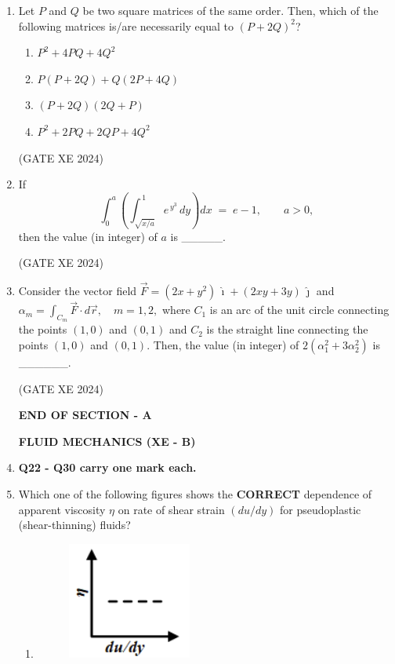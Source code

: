 \documentclass[12pt]{article}
\begin{document}
\begin{enumerate}
\item Let $P$ and $Q$ be two square matrices of the same order. Then, which of the
following matrices is/are necessarily equal to $(P+2Q)^2$?

\begin{enumerate}[label=(\Alph*)]
\item $P^{2}+4PQ+4Q^{2}$
\item $P(P+2Q)+Q(2P+4Q)$
\item $(P+2Q)(2Q+P)$
\item $P^{2}+2PQ+2QP+4Q^{2}$
\end{enumerate}
(GATE XE 2024)

\item If
$$
\int_{0}^{a}\left(\int_{\sqrt{x/a}}^{\,1} e^{\,y^{3}}\,dy\right)dx \;=\; e-1,\qquad a>0,
$$
then the value (in integer) of $a$ is \_\_\_\_\_.

(GATE XE 2024)

\item Consider the vector field
$
\vec F=(2x+y^{2})\,\hat{\imath}+(2xy+3y)\,\hat{\jmath}
$
and 
$
\alpha_m=\int_{C_m}\vec F\cdot d\vec r,\quad m=1,2,
$
where $C_1$ is an arc of the unit circle connecting the points $(1,0)$ and $(0,1)$ and $C_2$ is the straight line connecting the points $(1,0)$ and $(0,1)$. Then, the value (in integer) of 
$
2\left(\alpha_1^{2}+3\alpha_2^{2}\right)
$
is \_\_\_\_\_\_.

(GATE XE 2024)

\begin{center}
    \textbf{END OF SECTION - A}
\end{center}

\newpage

\begin{center}
    {\Large \textbf{FLUID MECHANICS (XE - B)}}
\end{center}

\item[] \textbf{Q22 - Q30 carry one mark each.}
\item Which one of the following figures shows the \textbf{CORRECT} dependence of apparent viscosity $\eta$ on rate of shear strain $\left(du/dy\right)$ for pseudoplastic (shear-thinning) fluids?

\begin{enumerate}
\item  \begin{figure}[H]
    \centering
    \includegraphics[width=0.3\columnwidth]{figs/ass5_b_q22_a.png}
    \caption{}
    \label{fig:placeholder}
\end{figure}


\end{enumerate}
\end{enumerate}
\end{document}
